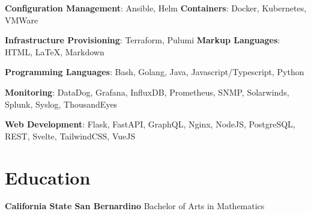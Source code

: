 \documentclass[letterpaper,11pt]{article}
\newcommand{\technicalSkill}[1]{
  \small{#1}
}
\begin{document}
  \technicalSkill{
    \textbf{Configuration Management}{: Ansible, Helm}
    \hfill
    \textbf{Containers}{: Docker, Kubernetes, VMWare}
  }

  \technicalSkill{
    \textbf{Infrastructure Provisioning}{: Terraform, Pulumi}
    \hfill
    \textbf{Markup Languages}{: HTML, {\LaTeX}, Markdown}
  }

  \technicalSkill{
    \textbf{Programming Languages}{: Bash, Golang, Java, Javascript/Typescript, Python}
  }

  \technicalSkill{
    \textbf{Monitoring}{: DataDog, Grafana, InfluxDB, Prometheus, SNMP, Solarwinds, Splunk, Syslog, ThousandEyes}
  }

  \technicalSkill{
    \textbf{Web Development}{: Flask, FastAPI, GraphQL, Nginx, NodeJS, PostgreSQL, REST, Svelte, TailwindCSS, VueJS}
  }

\section{Education}
  \technicalSkill
  {\textbf{California State San Bernardino}
  \hfill
  Bachelor of Arts in Mathematics}

\end{document}
